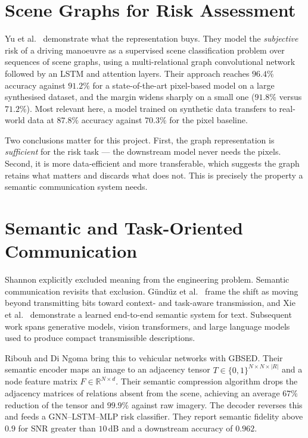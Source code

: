 \documentclass{iutbscthesis}
\begin{document}
\section{Scene Graphs for Risk Assessment}

Yu et al.\ \cite{yu2021scene} demonstrate what the representation buys. They
model the \emph{subjective} risk of a driving manoeuvre as a supervised scene
classification problem over sequences of scene graphs, using a multi-relational
graph convolutional network \cite{schlichtkrull2018modeling} followed by an
LSTM and attention layers. Their approach reaches $96.4\%$ accuracy against
$91.2\%$ for a state-of-the-art pixel-based model on a large synthesised
dataset, and the margin widens sharply on a small one ($91.8\%$ versus
$71.2\%$). Most relevant here, a model trained on synthetic data transfers to
real-world data at $87.8\%$ accuracy against $70.3\%$ for the pixel baseline.

Two conclusions matter for this project. First, the graph representation is
\emph{sufficient} for the risk task --- the downstream model never needs the
pixels. Second, it is more data-efficient and more transferable, which suggests
the graph retains what matters and discards what does not. This is precisely
the property a semantic communication system needs.

\section{Semantic and Task-Oriented Communication}

Shannon \cite{shannon1948mathematical} explicitly excluded meaning from the
engineering problem. Semantic communication revisits that exclusion.
G\"und\"uz et al.\ \cite{gunduz2023beyond} frame the shift as moving beyond
transmitting bits toward context- and task-aware transmission, and Xie et al.\
\cite{xie2021deep} demonstrate a learned end-to-end semantic system for text.
Subsequent work spans generative models, vision transformers, and large
language models used to produce compact transmissible descriptions.

Ribouh and Di Ngoma \cite{ribouh2026graph} bring this to vehicular networks
with GBSED. Their semantic encoder maps an image to an adjacency tensor
$T \in \{0,1\}^{N \times N \times |R|}$ and a node feature matrix
$F \in \mathbb{R}^{N \times d}$. Their semantic compression algorithm drops the
adjacency matrices of relations absent from the scene, achieving an average
$67\%$ reduction of the tensor and $99.9\%$ against raw imagery. The decoder
reverses this and feeds a GNN--LSTM--MLP risk classifier. They report semantic
fidelity above $0.9$ for SNR greater than $10$\,dB and a downstream accuracy of
$0.962$.
\end{document}
